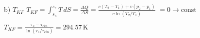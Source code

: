b) \( T_{KF} \)  
\( T_{KF} = \int_{s_a}^{s_e} T \, dS = \frac{\Delta Q}{\Delta S} = \frac{c(T_2 - T_1) + v(p_2 - p_1)}{c \ln(T_2/T_1)} \)  
\( = 0 \rightarrow \text{const} \)  

\( T_{KF} = \frac{\tau_s - \tau_{ein}}{\ln(\tau_s/\tau_{ein})} = 294.57 \, \text{K} \)